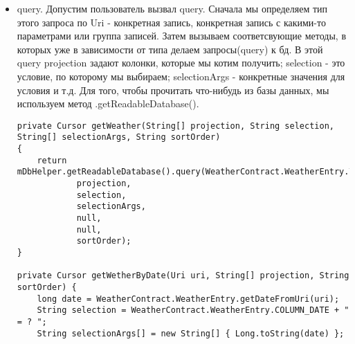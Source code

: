 \documentclass[12 pt]{article}
\begin{document}
	\begin{itemize}
    	\item query. Допустим пользователь вызвал query. Сначала мы определяем тип этого запроса по Uri - конкретная запись, конкретная запись с какими-то параметрами или группа записей. Затем вызываем соответсвующие методы, в которых уже в зависимости от типа делаем запросы(query) к бд. В этой query projection задают колонки, которые мы котим получить; selection - это условие, по которому мы выбираем; selectionArgs - конкретные значения для условия и т.д. Для того, чтобы прочитать что-нибудь из базы данных, мы используем метод .getReadableDatabase().
    	\begin{lstlisting}
private Cursor getWeather(String[] projection, String selection, String[] selectionArgs, String sortOrder)
{
    return mDbHelper.getReadableDatabase().query(WeatherContract.WeatherEntry.TABLE_NAME,
            projection,
            selection,
            selectionArgs,
            null,
            null,
            sortOrder);
}

private Cursor getWetherByDate(Uri uri, String[] projection, String sortOrder) {
    long date = WeatherContract.WeatherEntry.getDateFromUri(uri);
    String selection = WeatherContract.WeatherEntry.COLUMN_DATE + " = ? ";
    String selectionArgs[] = new String[] { Long.toString(date) };


\end{lstlisting}
\end{itemize}
\end{document}
